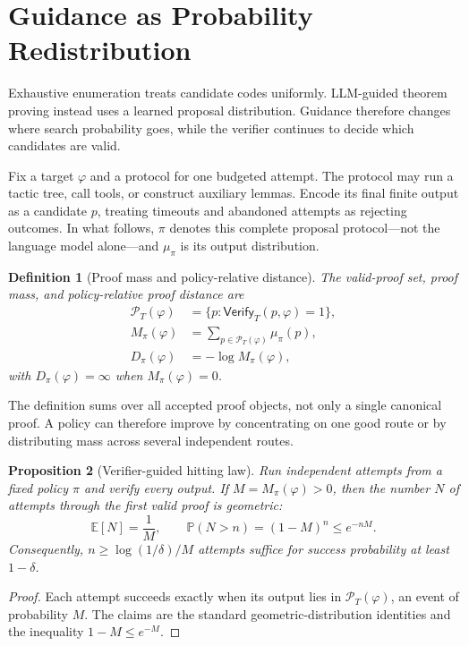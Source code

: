 \documentclass[11pt]{article}
\newtheorem{definition}{Definition}[section]
\newtheorem{proposition}[definition]{Proposition}
\newcommand{\Verify}{\mathsf{Verify}}
\newcommand{\E}{\mathbb{E}}
\newcommand{\Prob}{\mathbb{P}}
\begin{document}
\section{Guidance as Probability Redistribution}

Exhaustive enumeration treats candidate codes uniformly.  LLM-guided theorem
proving instead uses a learned proposal distribution.  Guidance therefore
changes where search probability goes, while the verifier continues to decide
which candidates are valid.

Fix a target $\varphi$ and a protocol for one budgeted attempt.  The protocol
may run a tactic tree, call tools, or construct auxiliary lemmas.  Encode its
final finite output as a candidate $p$, treating timeouts and abandoned
attempts as rejecting outcomes.  In what follows, $\pi$ denotes this complete
proposal protocol---not the language model alone---and $\mu_\pi$ is its output
distribution.

\begin{definition}[Proof mass and policy-relative distance]\label{def:proof-mass}
The valid-proof set, proof mass, and policy-relative proof distance are
\[
\begin{aligned}
  \mathcal P_T(\varphi)
    &=\{p:\Verify_T(p,\varphi)=1\},\\
  M_\pi(\varphi)
    &=\sum_{p\in\mathcal P_T(\varphi)}\mu_\pi(p),\\
  D_\pi(\varphi)
    &=-\log M_\pi(\varphi),
\end{aligned}
\]
with $D_\pi(\varphi)=\infty$ when $M_\pi(\varphi)=0$.
\end{definition}

The definition sums over all accepted proof objects, not only a single
canonical proof.  A policy can therefore improve by concentrating on one good
route or by distributing mass across several independent routes.

\begin{proposition}[Verifier-guided hitting law]
\label{prop:hitting}
Run independent attempts from a fixed policy $\pi$ and verify every output.
If $M=M_\pi(\varphi)>0$, then the number $N$ of attempts through the first valid
proof is geometric:
\[
  \E[N]=\frac{1}{M},
  \qquad
  \Prob(N>n)=(1-M)^n\leq e^{-nM}.
\]
Consequently, $n\geq \log(1/\delta)/M$ attempts suffice for success probability
at least $1-\delta$.
\end{proposition}

\begin{proof}
Each attempt succeeds exactly when its output lies in
$\mathcal P_T(\varphi)$, an event of probability $M$.  The claims are the
standard geometric-distribution identities and the inequality
$1-M\leq e^{-M}$.
\end{proof}
\end{document}
